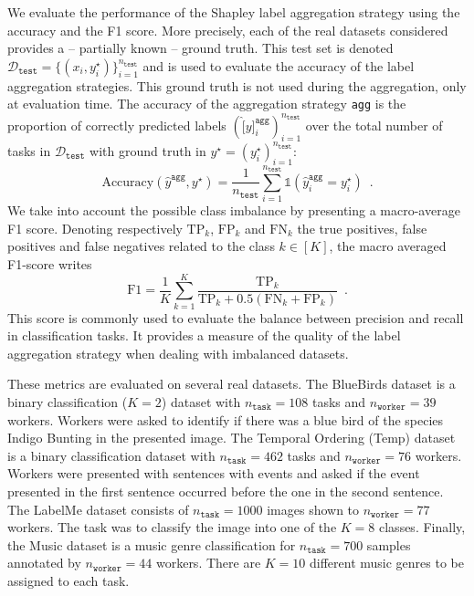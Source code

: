 \documentclass{cap2024}
\begin{document}
We evaluate the performance of the Shapley label aggregation strategy using the accuracy and the F1 score.
More precisely, each of the real datasets considered provides a -- partially known -- ground truth.
This test set is denoted $\mathcal{D}_\texttt{test}=\{(x_i, y_i^\star)\}_{i=1}^{n_\texttt{test}}$ and is used to evaluate the accuracy of the label aggregation strategies.
This ground truth is not used during the aggregation, only at evaluation time.
The accuracy of the aggregation strategy \texttt{agg} is the proportion of correctly predicted labels $(\hat[y]^\texttt{agg}_i)_{i=1}^{n_\texttt{test}}$ over the total number of tasks in $\mathcal{D}_\texttt{test}$ with ground truth in $y^\star=(y_i^\star)_{i=1}^{n_\texttt{test}}$:
\[\mathrm{Accuracy}(\hat{y}^\texttt{agg}, y^\star) = \frac{1}{n_\texttt{test}}\sum_{i=1}^{n_\texttt{test}} \mathds{1}(\hat{y}^\texttt{agg}_i=y_i^\star) \enspace.\]
We take into account the possible class imbalance by presenting a macro-average F1 score. Denoting respectively $\mathrm{TP}_k$, $\mathrm{FP}_k$ and $\mathrm{FN}_k$ the true positives, false positives and false negatives related to the class $k\in[K]$, the macro averaged F1-score writes
\[
\mathrm{F1} = \frac{1}{K}\sum_{k=1}^K\frac{\mathrm{TP}_k}{\mathrm{TP}_k + 0.5(\mathrm{FN}_k + \mathrm{FP}_k)}\enspace.
\]
This score is commonly used to evaluate the balance between precision and recall in classification tasks. It provides a measure of the quality of the label aggregation strategy when dealing with imbalanced datasets.

These metrics are evaluated on several real datasets.
The BlueBirds dataset \citep{WelinderEtal10b} is a binary classification ($K=2$) dataset with $n_\texttt{task}=108$ tasks and $n_\texttt{worker}=39$ workers. Workers were asked to identify if there was a blue bird of the species Indigo Bunting in the presented image.
The Temporal Ordering (Temp) \citep{snow_cheap_2008} dataset is a binary classification dataset with $n_\texttt{task}=462$ tasks and $n_\texttt{worker}=76$ workers. Workers were presented with sentences with events and asked if the event presented in the first sentence occurred before the one in the second sentence.
The LabelMe dataset \citep{rodrigues2018deep} consists of $n_\texttt{task}=1000$ images shown to $n_\texttt{worker}=77$ workers. The task was to classify the image into one of the $K=8$ classes.
Finally, the Music dataset \citep{rodrigues2014gaussian} is a music genre classification for $n_\texttt{task}=700$ samples annotated by $n_\texttt{worker}=44$ workers. There are $K=10$ different music genres to be assigned to each task.
\end{document}
